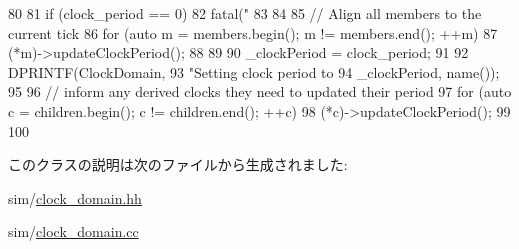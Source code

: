 \begin{DoxyCode}
80 {
81     if (clock_period == 0) {
82         fatal("%
83     }
84 
85     // Align all members to the current tick
86     for (auto m = members.begin(); m != members.end(); ++m) {
87         (*m)->updateClockPeriod();
88     }
89 
90     _clockPeriod = clock_period;
91 
92     DPRINTF(ClockDomain,
93             "Setting clock period to %
94             _clockPeriod, name());
95 
96     // inform any derived clocks they need to updated their period
97     for (auto c = children.begin(); c != children.end(); ++c) {
98         (*c)->updateClockPeriod();
99     }
100 }
\end{DoxyCode}


このクラスの説明は次のファイルから生成されました:\begin{DoxyCompactItemize}
\item 
sim/\hyperlink{clock__domain_8hh}{clock\_\-domain.hh}\item 
sim/\hyperlink{clock__domain_8cc}{clock\_\-domain.cc}\end{DoxyCompactItemize}
